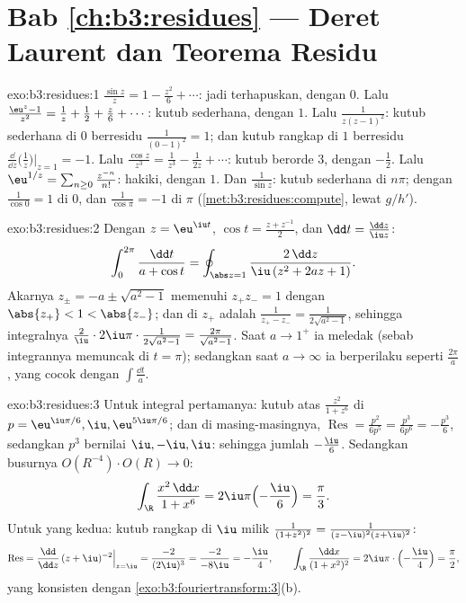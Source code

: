 \section*{Bab \ref{ch:b3:residues} --- Deret Laurent dan
Teorema Residu}

\begin{solution}{exo:b3:residues:1}
$\frac{\sin z}z = 1 - \frac{z^2}6 + \cdots$: jadi terhapuskan, dengan
 $0$. Lalu $\frac{\eu^z - 1}{z^2} = \frac1z + \frac12 +
\frac z6 + \cdots$: kutub sederhana, dengan  $1$.
Lalu $\frac1{z(z-1)^2}$: kutub sederhana di $0$ berresidu
$\frac1{(0-1)^2} = 1$; dan kutub rangkap di $1$ berresidu
$\frac{\dd}{\dd z}\bigl(\frac1z\bigr)\big|_{z=1} = -1$.
Lalu $\frac{\cos z}{z^3} = \frac1{z^3} - \frac1{2z} + \cdots$: kutub
berorde $3$, dengan  $-\frac12$. Lalu $\eu^{1/z} = \sum_{n\geq0}
\frac{z^{-n}}{n!}$: hakiki, dengan  $1$. Dan $\frac1{\sin z}$:
kutub sederhana di $n\pi$; dengan  $\frac1{\cos 0} = 1$ di $0$, dan
$\frac1{\cos\pi} = -1$ di $\pi$
(\cref{met:b3:residues:compute}, lewat $g/h'$).
\end{solution}

\begin{solution}{exo:b3:residues:2}
Dengan $z = \eu^{\iu t}$, $\cos t = \frac{z + z^{-1}}2$, dan $\dd t
= \frac{\dd z}{\iu z}$:
\[
\int_0^{2\pi}\frac{\dd t}{a + \cos t}
= \oint_{\abs z = 1}\frac{2\,\dd z}{\iu\,(z^2 + 2az + 1)} .
\]
Akarnya $z_\pm = -a \pm \sqrt{a^2 - 1}$ memenuhi $z_+z_- =
1$ dengan $\abs{z_+} < 1 < \abs{z_-}$; dan  di $z_+$ adalah
$\frac{1}{z_+ - z_-} = \frac1{2\sqrt{a^2-1}}$, sehingga integralnya
$\frac2\iu\cdot2\iu\pi\cdot\frac1{2\sqrt{a^2-1}} =
\frac{2\pi}{\sqrt{a^2-1}}$. Saat $a \to 1^+$ ia meledak (sebab
integrannya memuncak di $t = \pi$); sedangkan saat $a \to \infty$ ia berperilaku
seperti $\frac{2\pi}a$, yang cocok dengan $\int\frac{\dd t}a$.
\end{solution}

\begin{solution}{exo:b3:residues:3}
Untuk integral pertamanya: kutub atas $\frac{z^2}{1+z^6}$ di $p =
\eu^{\iu\pi/6}, \iu, \eu^{5\iu\pi/6}$; dan di masing-masingnya,
$\operatorname{Res} = \frac{p^2}{6p^5} = \frac{p^3}{6p^6} =
-\frac{p^3}6$, sedangkan $p^3$ bernilai $\iu, -\iu, \iu$:
sehingga jumlah  $-\frac{\iu}{6}$. Sedangkan busurnya
$O(R^{-4})\cdot O(R) \to 0$:
\[
\int_\R\frac{x^2\,\dd x}{1 + x^6} =
2\iu\pi\Bigl(-\frac \iu6\Bigr) = \frac\pi3 .
\]
Untuk yang kedua: kutub rangkap di $\iu$ milik $\frac1{(1+z^2)^2} =
\frac1{(z-\iu)^2(z+\iu)^2}$:
\[
\operatorname{Res} = \frac{\dd}{\dd z}\,(z +
\iu)^{-2}\Big|_{z=\iu} = \frac{-2}{(2\iu)^3} =
\frac{-2}{-8\iu} = -\frac\iu4,
\qquad
\int_\R\frac{\dd x}{(1+x^2)^2} =
2\iu\pi\cdot\Bigl(-\frac\iu4\Bigr) = \frac\pi2 ,
\]
yang konsisten dengan \cref{exo:b3:fouriertransform:3}(b).
\end{solution}

